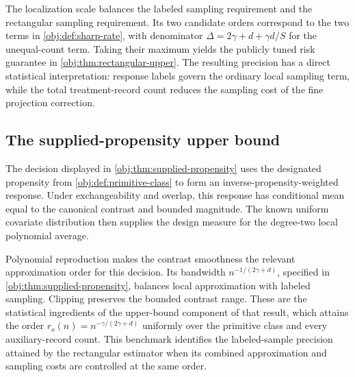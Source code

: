 The localization scale balances the labeled sampling requirement and the rectangular sampling requirement. Its two candidate orders correspond to the two terms in \cref{obj:def:sharp-rate}, with denominator \(\Delta=2\gamma+d+\gamma d/S\) for the unequal-count term. Taking their maximum yields the publicly tuned risk guarantee in \cref{obj:thm:rectangular-upper}. The resulting precision has a direct statistical interpretation: response labels govern the ordinary local sampling term, while the total treatment-record count reduces the sampling cost of the fine projection correction.

\subsection{The supplied-propensity upper bound}

The decision displayed in \cref{obj:thm:supplied-propensity} uses the designated propensity from \cref{obj:def:primitive-class} to form an inverse-propensity-weighted response. Under exchangeability and overlap, this response has conditional mean equal to the canonical contrast and bounded magnitude. The known uniform covariate distribution then supplies the design measure for the degree-two local polynomial average.

Polynomial reproduction makes the contrast smoothness the relevant approximation order for this decision. Its bandwidth \(n^{-1/(2\gamma+d)}\), specified in \cref{obj:thm:supplied-propensity}, balances local approximation with labeled sampling. Clipping preserves the bounded contrast range. These are the statistical ingredients of the upper-bound component of that result, which attains the order \(r_o(n)=n^{-\gamma/(2\gamma+d)}\) uniformly over the primitive class and every auxiliary-record count. This benchmark identifies the labeled-sample precision attained by the rectangular estimator when its combined approximation and sampling costs are controlled at the same order.
